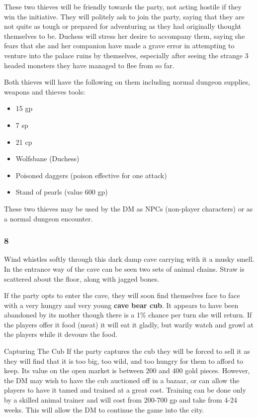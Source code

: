 \documentclass[palace_of_the_silver_princess]{subfiles}
\begin{document}
These two thieves will be friendly towards the party, not acting hostile
if they win the initiative. They will politely ask to join the party,
saying that they are not quite as tough or prepared for adventuring as
they had originally thought themselves to be. Duchess will stress her
desire to accompany them, saying she fears that she and her companion
have made a grave error in attempting to venture into the palace ruins
by themselves, especially after seeing the strange 3 headed monsters
they have managed to flee from so far.

Both thieves will have the following on them including normal dungeon
supplies, weapons and thieves tools:

\begin{itemize}
    \item 15 gp
    \item 7 sp
    \item 21 cp
    \item Wolfsbane (Duchess)
    \item Poisoned daggers (poison effective for one attack)
    \item Stand of pearls (value 600 gp)
\end{itemize}

These two thieves may be used by the DM as NPCs (non-player characters)
or as a normal dungeon encounter.

\subsubsection{8}
\begin{quotebox}
    Wind whistles softly through this dark damp cave carrying with it a
    musky smell. In the entrance way of the cave can be seen two sets of
    animal chains. Straw is scattered about the floor, along with jagged
    bones.
\end{quotebox}

If the party opts to enter the cave, they will soon find themselves face
to face with a very hungry and very young \textbf{cave bear cub}.  It
appears to have been abandoned by its mother though there is a 1\%
chance per turn she will return. If the players offer it food (meat) it
will eat it gladly, but warily watch and growl at the players while it
devours the food.

\begin{paperbox}{Capturing The Cub}
If the party captures the cub they will be forced to sell it as they
will find that it is too big, too wild, and too hungry for them to
afford to keep. Its value on the open market is between 200 and 400 gold
pieces. However, the DM may wish to have the cub auctioned off in a
bazaar, or can allow the players to have it tamed and trained at a great
cost. Training can be done only by a skilled animal trainer and will
cost from 200-700 gp and take from 4-24 weeks. This will allow the DM to
continue the game into the city.
\end{paperbox}
\end{document}
